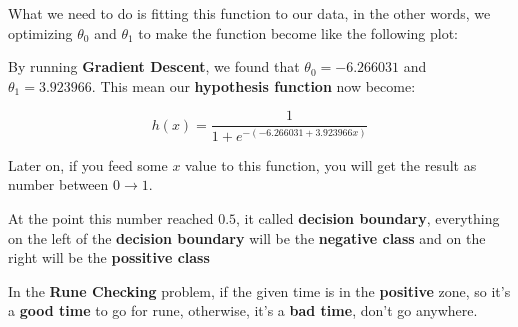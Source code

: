 \documentclass{article}
\begin{document}
\begin{flushleft}
What we need to do is fitting this function to our data, in the other words, we optimizing $\theta_{0}$ and $\theta_{1}$ to make the function become like the following plot:
\end{flushleft}

\begin{center}
\end{center}

\begin{flushleft}
By running \textbf{Gradient Descent}, we found that $\theta_{0}=-6.266031$ and $\theta_{1}=3.923966$. This mean our \textbf{hypothesis function} now become:
\end{flushleft}

\begin{equation}
    h(x) = \frac{1}{1 + e^{-(-6.266031 + 3.923966x)}}    
\end{equation}

\begin{flushleft}
Later on, if you feed some $x$ value to this function, you will get the result as number between $0 \rightarrow 1$.
\end{flushleft}
\begin{flushleft}
At the point this number reached $0.5$, it called \textbf{decision boundary}, everything on the left of the \textbf{decision boundary} will be the \textbf{negative class} and on the right will be the \textbf{possitive class}
\end{flushleft}

\begin{center}
\end{center}

\begin{flushleft}
In the \textbf{Rune Checking} problem, if the given time is in the \textbf{positive} zone, so it's a \textbf{good time} to go for rune, otherwise, it's a \textbf{bad time}, don't go anywhere.
\end{flushleft}
\end{document}
